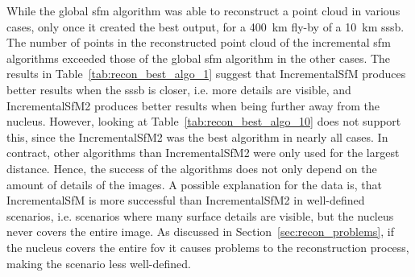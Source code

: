 \begin{table}[htb]
    \centering
    \caption{\Gls{sfm} algorithm with most reconstructed points for each scenario with a \SI{10}{\kilo\meter} \gls{sssb}. Seq1 refers to algorithm IncrementalSfM, Seq2 refers to algorithm IncrementalSfM2 and Glob refers to algorithm GlobalSfM.}
    \label{tab:recon_best_algo_10}
\end{table}


While the global \gls{sfm} algorithm was able to reconstruct a point cloud in various cases, only once it created the best output, for a \SI{400}{\kilo\meter} fly-by of a \SI{10}{\kilo\meter} \gls{sssb}. The number of points in the reconstructed point cloud of the incremental \gls{sfm} algorithms exceeded those of the global \gls{sfm} algorithm in the other cases.
The results in Table~\ref{tab:recon_best_algo_1} suggest that IncrementalSfM produces better results when the \gls{sssb} is closer, i.e. more details are visible, and IncrementalSfM2 produces better results when being further away from the nucleus. However, looking at Table~\ref{tab:recon_best_algo_10} does not support this, since the IncrementalSfM2 was the best algorithm in nearly all cases. In contract, other algorithms than IncrementalSfM2 were only used for the largest distance. Hence, the success of the algorithms does not only depend on the amount of details of the images. A possible explanation for the data is, that IncrementalSfM is more successful than IncrementalSfM2 in well-defined scenarios, i.e. scenarios where many surface details are visible, but the nucleus never covers the entire image. As discussed in Section~\ref{sec:recon_problems}, if the nucleus covers the entire \gls{fov} it causes problems to the reconstruction process, making the scenario less well-defined.

